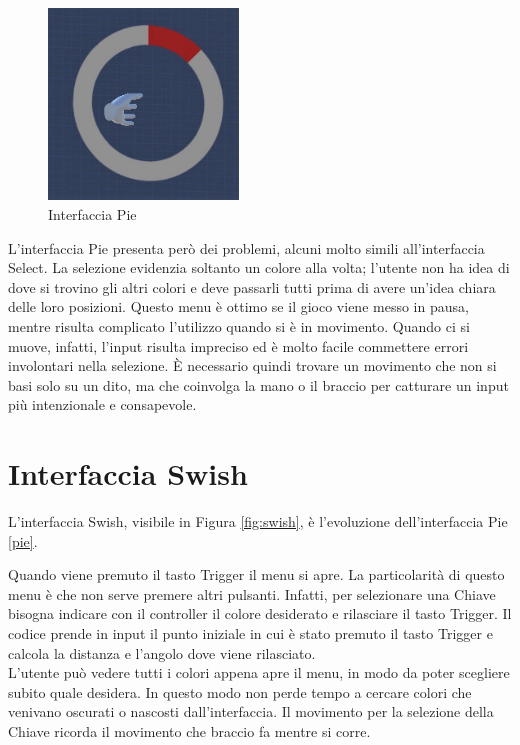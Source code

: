 \documentclass[target=bach,aauheader=]{thud}
\begin{document}
\begin{figure}[h]
    \centering
    \includegraphics[width=0.45\textwidth]{pie}
    \caption{Interfaccia Pie}
    \label{fig:pie}
\end{figure}

L'interfaccia Pie presenta però dei problemi, alcuni molto simili all'interfaccia Select.
La selezione evidenzia soltanto un colore alla volta; l'utente non ha idea di dove si trovino gli altri colori e deve passarli tutti prima di avere un'idea chiara delle loro posizioni.  
Questo menu è ottimo se il gioco viene messo in pausa, mentre risulta complicato l'utilizzo quando si è in movimento.
Quando ci si muove, infatti, l'input risulta impreciso ed è molto facile commettere errori involontari nella selezione.
È necessario quindi trovare un movimento che non si basi solo su un dito, ma che coinvolga la mano o il braccio per catturare un input più intenzionale e consapevole.

\section{Interfaccia Swish} %
\label{swish}
L'interfaccia Swish, visibile in Figura \ref{fig:swish}, è l'evoluzione dell'interfaccia Pie \ref{pie}.

Quando viene premuto il tasto Trigger il menu si apre.
La particolarità di questo menu è che non serve premere altri pulsanti.
Infatti, per selezionare una Chiave bisogna indicare con il controller il colore desiderato e rilasciare il tasto Trigger.
Il codice prende in input il punto iniziale in cui è stato premuto il tasto Trigger e calcola la distanza e l'angolo dove viene rilasciato. \\

L'utente può vedere tutti i colori appena apre il menu, in modo da poter scegliere subito quale desidera.
In questo modo non perde tempo a cercare colori che venivano oscurati o nascosti dall'interfaccia.
Il movimento per la selezione della Chiave ricorda il movimento che braccio fa mentre si corre.
\end{document}
